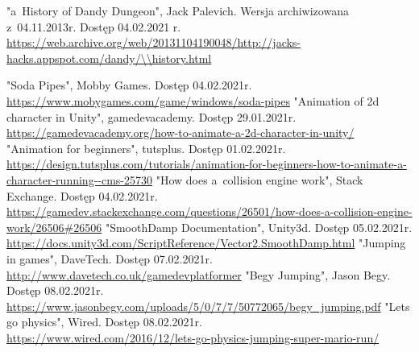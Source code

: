 \documentclass[oneside,polski,logo]{amuthesis}
\begin{document}
\begin{thebibliography}{100}
 "a~History of Dandy Dungeon", Jack Palevich. Wersja archiwizowana z~04.11.2013r. Dostęp 04.02.2021 r.
\\ \url{https://web.archive.org/web/20131104190048/http://jacks-hacks.appspot.com/dandy/\\history.html}

"Soda Pipes", Mobby Games. Dostęp 04.02.2021r.
\\ \url{https://www.mobygames.com/game/windows/soda-pipes}
"Animation of 2d character in Unity", gamedevacademy. Dostęp 29.01.2021r.
\\ \url{https://gamedevacademy.org/how-to-animate-a-2d-character-in-unity/}
"Animation for beginners", tutsplus. Dostęp 01.02.2021r.
\\ \url{https://design.tutsplus.com/tutorials/animation-for-beginners-how-to-animate-a-character-running--cms-25730}
"How does a~collision engine work", Stack Exchange. Dostęp 04.02.2021r.
\\ \url{https://gamedev.stackexchange.com/questions/26501/how-does-a-collision-engine-work/26506\#26506}
"SmoothDamp Documentation", Unity3d. Dostęp 05.02.2021r.
\\ \url{https://docs.unity3d.com/ScriptReference/Vector2.SmoothDamp.html}
"Jumping in games", DaveTech. Dostęp 07.02.2021r.
\\ \url{http://www.davetech.co.uk/gamedevplatformer}
"Begy Jumping", Jason Begy. Dostęp 08.02.2021r.
\\ \url{https://www.jasonbegy.com/uploads/5/0/7/7/50772065/begy\_jumping.pdf}
"Lets go physics", Wired. Dostęp 08.02.2021r.
\\ \url{https://www.wired.com/2016/12/lets-go-physics-jumping-super-mario-run/}
\end{thebibliography}
\end{document}
